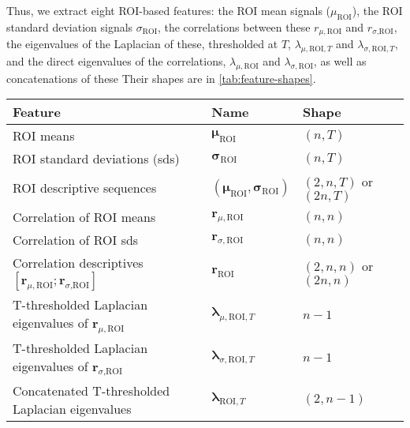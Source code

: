 \documentclass[10pt]{article}
\newcommand{\tsub}[2]{\mathbf{#1}_{\text{#2}}}
\begin{document}
Thus, we extract eight ROI-based features: the ROI mean signals (\(\mu_{\text{ROI}}\)), the ROI
standard deviation signals \(\sigma_{\text{ROI}}\), the correlations between these
\(r_{\mu,\text{ROI}}\) and \(r_{\sigma\text{,ROI}}\), the eigenvalues of the Laplacian of these,
thresholded at \(T\), \(\lambda_{\mu,\text{ROI},T}\) and \(\lambda_{\sigma,\text{ROI},T}\), and the
direct eigenvalues of the correlations, \(\lambda_{\mu,\text{ROI}}\) and
\(\lambda_{\sigma,\text{ROI}}\), as well as concatenations of these  Their shapes are in \ref{tab:feature-shapes}.


\begin{table}
	\centering
	\begin{tabular}{lll}
		\toprule
		Feature     & Name     & Shape  \\
		\midrule
    ROI means                                                                                  & \(\tsub{\mu}{ROI}\)                        & \((n, T)\)    \\
    ROI standard deviations (sds)                                                              & \(\tsub{\sigma}{ROI}\)                     & \((n, T)\)    \\
    ROI descriptive sequences                                                                  & \((\tsub{\mu}{ROI}, \tsub{\sigma}{ROI})\)  & \((2, n, T)\) or \((2n, T)\) \\
    Correlation of ROI means                                                                   & \(\mathbf{r}_{\mu,\text{ROI}}\)            & \((n, n)\)    \\
    Correlation of ROI sds                                                                     & \(\mathbf{r}_{\sigma,\text{ROI}}\)         & \((n, n)\)    \\
    Correlation descriptives \([\mathbf{r}_{\mu,\text{ROI}}; \mathbf{r}_{\sigma\text{,ROI}}]\) & \(\tsub{r}{ROI}\)                          & \((2, n, n)\) or \((2n, n)\)\\
    T-thresholded Laplacian eigenvalues of \(\mathbf{r}_{\mu,\text{ROI}}\)                     & \(\mathbf{\lambda}_{\mu,\text{ROI},T}\)    & \(n-1\)       \\
    T-thresholded Laplacian eigenvalues of \(\mathbf{r}_{\sigma\text{,ROI}}\)                  & \(\mathbf{\lambda}_{\sigma,\text{ROI},T}\) & \(n-1\)       \\
    Concatenated T-thresholded Laplacian eigenvalues                                           & \(\mathbf{\lambda}_{\text{ROI},T}\)        & \((2, n-1)\)  \\

\end{tabular}
\end{table}
\end{document}
